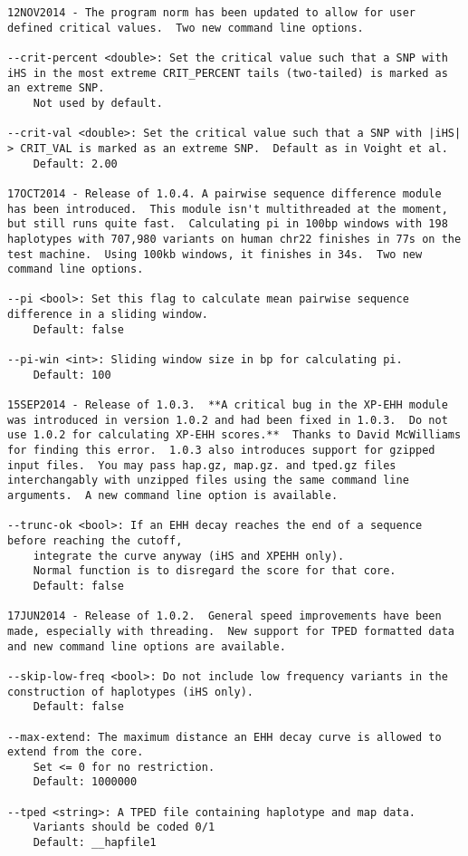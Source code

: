 \documentclass[12pt]{article}%
\begin{document}
\begin{lstlisting}
12NOV2014 - The program norm has been updated to allow for user defined critical values.  Two new command line options.

--crit-percent <double>: Set the critical value such that a SNP with iHS in the most extreme CRIT_PERCENT tails (two-tailed) is marked as an extreme SNP.
	Not used by default.

--crit-val <double>: Set the critical value such that a SNP with |iHS| > CRIT_VAL is marked as an extreme SNP.  Default as in Voight et al.
	Default: 2.00

17OCT2014 - Release of 1.0.4. A pairwise sequence difference module has been introduced.  This module isn't multithreaded at the moment, but still runs quite fast.  Calculating pi in 100bp windows with 198 haplotypes with 707,980 variants on human chr22 finishes in 77s on the test machine.  Using 100kb windows, it finishes in 34s.  Two new command line options.

--pi <bool>: Set this flag to calculate mean pairwise sequence difference in a sliding window.
	Default: false

--pi-win <int>: Sliding window size in bp for calculating pi.
	Default: 100

15SEP2014 - Release of 1.0.3.  **A critical bug in the XP-EHH module was introduced in version 1.0.2 and had been fixed in 1.0.3.  Do not use 1.0.2 for calculating XP-EHH scores.**  Thanks to David McWilliams for finding this error.  1.0.3 also introduces support for gzipped input files.  You may pass hap.gz, map.gz. and tped.gz files interchangably with unzipped files using the same command line arguments.  A new command line option is available.

--trunc-ok <bool>: If an EHH decay reaches the end of a sequence before reaching the cutoff,
	integrate the curve anyway (iHS and XPEHH only).
	Normal function is to disregard the score for that core.
	Default: false

17JUN2014 - Release of 1.0.2.  General speed improvements have been made, especially with threading.  New support for TPED formatted data and new command line options are available.

--skip-low-freq <bool>: Do not include low frequency variants in the construction of haplotypes (iHS only).
	Default: false

--max-extend: The maximum distance an EHH decay curve is allowed to extend from the core.
	Set <= 0 for no restriction.
	Default: 1000000

--tped <string>: A TPED file containing haplotype and map data.
	Variants should be coded 0/1
	Default: __hapfile1


\end{lstlisting}
\end{document}
